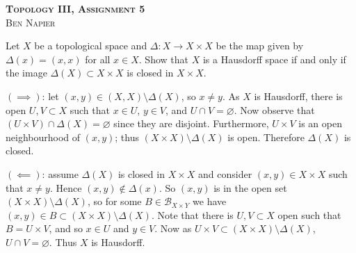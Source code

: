 \documentclass[a4paper, answers]{exam}
\begin{document}
\begin{center}
	\textbf{\textsc{Topology III, Assignment 5}} \\
	\textsc{Ben Napier}
	\vspace{1em}
\end{center}

\begin{questions}

	\question 
	Let $X$ be a topological space and
	$\Delta: X \to X \times X$
	be the map given by $\Delta(x) = (x,x)$
	for all $x \in X$.
	Show that $X$ is a Hausdorff space if and only if the image
	$\Delta(X) \subset X \times X$ is closed in $X \times X$.
	\begin{solution}
		$(\implies)$:
		let $(x,y) \in (X,X) \setminus \Delta(X)$,
		so $x \neq y$.
		As $X$ is Hausdorff, there is open $U,V \subset X$
		such that $x \in U$, $y \in V$, and $U \cap V = \varnothing$.
		Now observe that $(U \times V) \cap \Delta(X) = \varnothing$
		since they are disjoint.
		Furthermore, $U \times V$ is an open neighbourhood of $(x,y)$;
		thus $(X \times X) \setminus \Delta(X)$ is open.
		Therefore $\Delta(X)$ is closed.

		$(\impliedby)$:
		assume $\Delta(X)$ is closed in $X \times X$ and consider
		$(x,y) \in X \times X$ such that $x \neq y$.
		Hence $(x,y) \not\in \Delta(x)$.
		So $(x,y)$ is in the open set 
		$(X \times X) \setminus \Delta(X)$,
		so for some $B \in \mathcal B_{X \times Y}$
		we have $(x,y) \in B \subset \left( 
			X \times X 
		\right) \setminus \Delta(X)$.
		Note that there is $U, V \subset X$ open
		such that $B = U \times V$, 
		and so $x \in U$ and $y \in V$.
		Now as $U \times V \subset (X \times X) \setminus \Delta(X)$,
		$U \cap V = \varnothing$.
		Thus $X$ is Hausdorff.
	\end{solution}

\end{questions}
\end{document}
